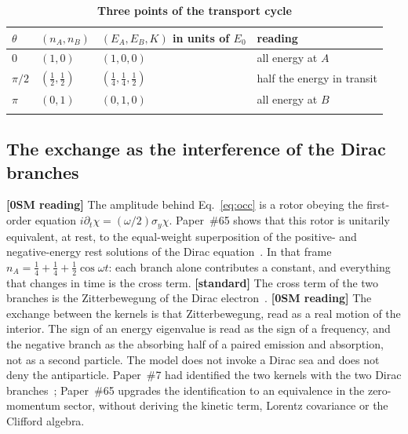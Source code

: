 \documentclass[%
 reprint, amsmath,amssymb, aps, prb, ]{revtex4-2}
\numberwithin{equation}{section}
\begin{document}
\begin{table}[t!]
\centering
\caption{\textbf{Three points of the transport cycle}}
\label{tab:states}
\renewcommand{\arraystretch}{1.35}
\setlength{\tabcolsep}{5pt}
\begin{tabular}{>{\raggedright\arraybackslash}p{0.9cm}>{\raggedright\arraybackslash}p{1.5cm}>{\raggedright\arraybackslash}p{2.0cm}>{\raggedright\arraybackslash}p{2.4cm}}
\toprule
$\theta$ & $(n_A, n_B)$ & $(E_A,E_B,K)$ in units of $E_0$ & \textbf{reading} \\
\midrule
$0$ & $(1,0)$ & $(1,0,0)$ & all energy at $A$ \\
\addlinespace[0.1cm]
$\pi/2$ & $(\tfrac12,\tfrac12)$ & $(\tfrac14,\tfrac14,\tfrac12)$ & half the energy in transit \\
\addlinespace[0.1cm]
$\pi$ & $(0,1)$ & $(0,1,0)$ & all energy at $B$ \\
\addlinespace[0.1cm]
\bottomrule
\end{tabular}
\end{table}

\subsection{The exchange as the interference of the Dirac branches}

\textbf{[0SM reading]} The amplitude behind Eq.~\eqref{eq:occ} is a rotor obeying the first-order equation $i\partial_t\chi = (\omega/2)\sigma_y\chi$. Paper~\#65 shows that this rotor is unitarily equivalent, at rest, to the equal-weight superposition of the positive- and negative-energy rest solutions of the Dirac equation~\cite{hanamura65}. In that frame $n_A = \tfrac14+\tfrac14+\tfrac12\cos\omega t$: each branch alone contributes a constant, and everything that changes in time is the cross term. \textbf{[standard]} The cross term of the two branches is the Zitterbewegung of the Dirac electron~\cite{Dirac1928,Schrodinger1930}. \textbf{[0SM reading]} The exchange between the kernels is that Zitterbewegung, read as a real motion of the interior. The sign of an energy eigenvalue is read as the sign of a frequency, and the negative branch as the absorbing half of a paired emission and absorption, not as a second particle. The model does not invoke a Dirac sea and does not deny the antiparticle. Paper~\#7 had identified the two kernels with the two Dirac branches~\cite{hanamura07}; Paper~\#65 upgrades the identification to an equivalence in the zero-momentum sector, without deriving the kinetic term, Lorentz covariance or the Clifford algebra.
\end{document}
